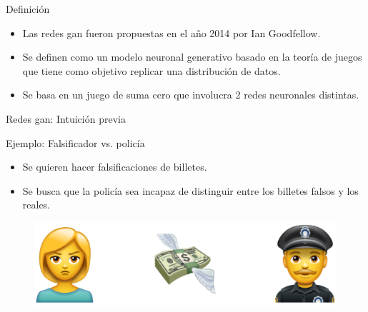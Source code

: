 \begin{frame}{Definición}

    \begin{itemize}
        \item Las redes \gls{gan} fueron propuestas en el año 2014 por Ian Goodfellow\cite{goodfellow2014generative}.
        \item Se definen como un modelo \alert{neuronal generativo} basado en la \alert{teoría de juegos} que tiene como objetivo \alert{replicar} una distribución de datos.
        \item Se basa en un juego de \alert{suma cero} que involucra \alert{2 redes neuronales distintas}.
    \end{itemize}
    
\end{frame}

\begin{frame}{Redes \gls{gan}: Intuición previa}

    \vfill
    {\Large Ejemplo: Falsificador vs. policía}
    
    \begin{itemize}
        \item Se quieren hacer \alert{falsificaciones} de billetes.
        \item Se busca que la policía sea \alert{incapaz de distinguir} entre los billetes falsos y los reales.
    \end{itemize}
    
    \begin{figure}
        \centering
        \includegraphics[width=\textwidth]{Slides/figures/GAN/PoliciaLadronBilletes 1.PNG}
    \end{figure}
    
\end{frame}


